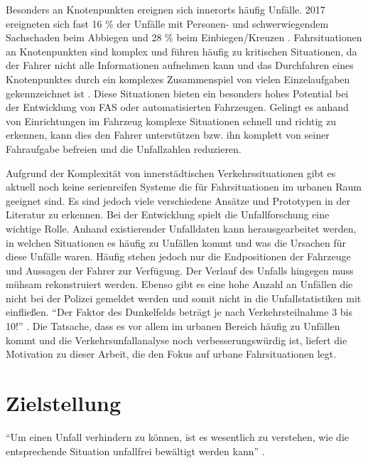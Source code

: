 Besonders an Knotenpunkten ereignen sich innerorts häufig Unfälle. 2017 ereigneten sich fast 16 \% der Unfälle mit Personen- und schwerwiegendem Sachschaden beim Abbiegen und 28 \% beim Einbiegen/Kreuzen \parencite[S. 68]{StatistischesBundesamt.2018b}. Fahrsituationen an Knotenpunkten sind komplex und führen häufig zu kritischen Situationen, da der Fahrer nicht alle Informationen aufnehmen kann \parencite[S. 2]{Gerstenberger.17.02.2015} und das Durchfahren eines Knotenpunktes durch ein komplexes Zusammenspiel von vielen Einzelaufgaben gekennzeichnet ist \parencite[S. 51]{Zademach.24.09.2015}. Diese Situationen bieten ein besonders hohes Potential bei der Entwicklung von FAS oder automatisierten Fahrzeugen. Gelingt es anhand von Einrichtungen im Fahrzeug komplexe Situationen schnell und richtig zu erkennen, kann dies den Fahrer unterstützen bzw. ihn komplett von seiner Fahraufgabe befreien und die Unfallzahlen reduzieren. 

Aufgrund der Komplexität von innerstädtischen Verkehrssituationen gibt es aktuell noch keine serienreifen Systeme die für Fahrsituationen im urbanen Raum geeignet sind. Es sind jedoch viele verschiedene Ansätze und Prototypen in der  Literatur zu erkennen. Bei der Entwicklung spielt die Unfallforschung eine wichtige Rolle. Anhand existierender Unfalldaten kann herausgearbeitet werden, in welchen Situationen es häufig zu Unfällen kommt und was die Ursachen für diese Unfälle waren. Häufig stehen jedoch nur die Endpositionen der Fahrzeuge und Aussagen der Fahrer zur Verfügung. Der Verlauf des Unfalls hingegen muss mühsam rekonstruiert werden. Ebenso gibt es eine hohe Anzahl an Unfällen die nicht bei der Polizei gemeldet werden und somit nicht in die Unfallstatistiken mit einfließen. \enquote{Der Faktor des Dunkelfelds beträgt je nach Verkehrsteilnahme 3 bis 10!} \parencite[S. 151]{Huguenin.2017}. Die Tatsache, dass es vor allem im urbanen Bereich häufig zu Unfällen kommt und die Verkehrsunfallanalyse noch verbesserungswürdig ist, liefert die Motivation zu dieser Arbeit, die den Fokus auf urbane Fahrsituationen legt. 

\section{Zielstellung}
\enquote{Um einen Unfall verhindern zu können, ist es wesentlich zu verstehen, wie die entsprechende Situation unfallfrei bewältigt werden kann} \parencite[S. 8]{Vollrath.2006}.

